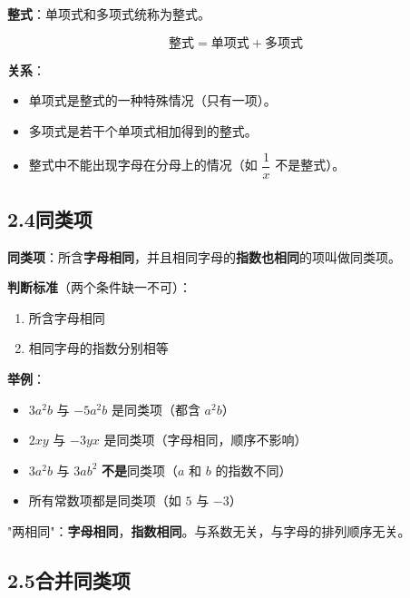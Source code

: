 \documentclass[12pt, a4paper]{ctexart}
\begin{document}
\begin{knowledgebox}[整式的概念]
\textbf{整式}：单项式和多项式统称为整式。

\[
\boxed{\text{整式} = \text{单项式} + \text{多项式}}
\]

\textbf{关系}：
\begin{itemize}[leftmargin=*]
  \item 单项式是整式的一种特殊情况（只有一项）。
  \item 多项式是若干个单项式相加得到的整式。
  \item 整式中不能出现字母在分母上的情况（如 $\dfrac{1}{x}$ 不是整式）。
\end{itemize}
\end{knowledgebox}

\subsection*{2.4\quad 同类项}

\begin{knowledgebox}[同类项的定义]
\textbf{同类项}：所含\textbf{字母相同}，并且相同字母的\textbf{指数也相同}的项叫做同类项。

\textbf{判断标准}（两个条件缺一不可）：
\begin{enumerate}[leftmargin=*]
  \item 所含字母相同
  \item 相同字母的指数分别相等
\end{enumerate}

\textbf{举例}：
\begin{itemize}[leftmargin=*]
  \item $3a^2b$ 与 $-5a^2b$ 是同类项（都含 $a^2b$）
  \item $2xy$ 与 $-3yx$ 是同类项（字母相同，顺序不影响）
  \item $3a^2b$ 与 $3ab^2$ \textbf{不是}同类项（$a$ 和 $b$ 的指数不同）
  \item 所有常数项都是同类项（如 $5$ 与 $-3$）
\end{itemize}
\end{knowledgebox}

\begin{tipbox}[判断同类项的口诀]
"两相同"：\textbf{字母相同}，\textbf{指数相同}。与系数无关，与字母的排列顺序无关。
\end{tipbox}

\subsection*{2.5\quad 合并同类项}
\end{document}
